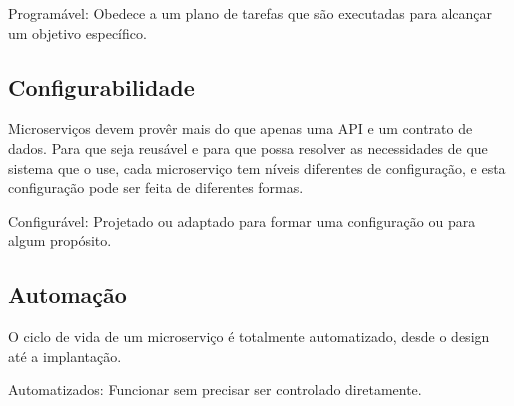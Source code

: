 Programável: Obedece a um plano de tarefas que são executadas para alcançar um objetivo específico.

\subsection{Configurabilidade}

Microserviços devem provêr mais do que apenas uma API e um contrato de dados. Para que seja reusável e para que possa resolver as necessidades de que sistema que o use, cada microserviço tem níveis diferentes de configuração, e esta configuração pode ser feita de diferentes formas.

Configurável: Projetado ou adaptado para formar uma configuração ou para algum propósito.

\subsection {Automação}

O ciclo de vida de um microserviço é totalmente automatizado, desde o design até a implantação.

Automatizados: Funcionar sem precisar ser controlado diretamente.



